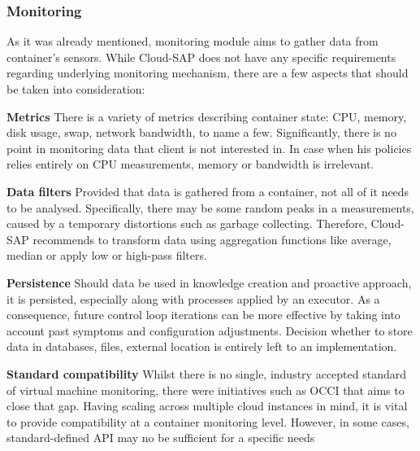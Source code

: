 \subsubsection{Monitoring}
As it was already mentioned, monitoring module aims to gather data from container's sensors. While Cloud-SAP does not have any specific requirements regarding underlying monitoring mechanism, there are a few aspects that should be taken into consideration:
\begin{asparaenum}
  \item[\textbf{Metrics}] There is a variety of metrics describing container state: CPU, memory, disk usage, swap, network bandwidth, to name a few. Significantly, there is no point in monitoring data that client is not interested in. In case when his policies relies entirely on CPU measurements, memory or bandwidth is irrelevant.

  \item[\textbf{Data filters}] Provided that data is gathered from a container, not all of it needs to be analysed. Specifically, there may be some random peaks in a measurements, caused by a temporary distortions such as garbage collecting. Therefore, Cloud-SAP recommends to transform data using aggregation functions like average, median or apply low or high-pass filters.

  \item[\textbf{Persistence}] Should data be used in knowledge creation and proactive approach, it is persisted, especially along with processes applied by an executor. As a consequence, future control loop iterations can be more effective by taking into account past symptoms and configuration adjustments. Decision whether to store data in databases, files, external location is entirely left to an implementation.

  \item[\textbf{Standard compatibility}] Whilst there is no single, industry accepted standard of virtual machine monitoring, there were initiatives such as OCCI \cite{OCCI} that aims to close that gap. Having scaling across multiple cloud instances in mind, it is vital to provide compatibility at a container monitoring level. However, in some cases, standard-defined API may no be sufficient for a specific needs  
\end{asparaenum}


